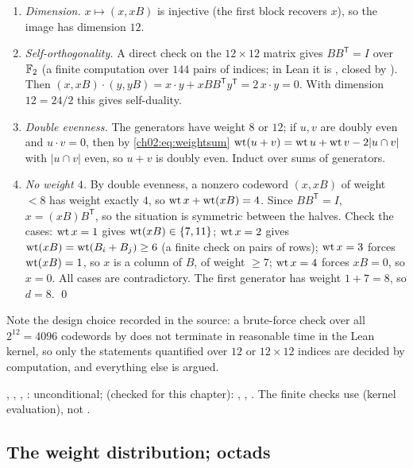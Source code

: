 \begin{enumerate}
\item \emph{Dimension.}  $x\mapsto(x,xB)$ is injective (the first block recovers $x$), so the image
has dimension $12$.
\item \emph{Self-orthogonality.}  A direct check on the $12\times12$ matrix gives $BB^{\mathsf
T}=I$ over $\mathbb{F}_2$ (a finite computation over $144$ pairs of indices; in Lean it is
, closed by ).  Then $(x,xB)\cdot(y,yB)=x\cdot
y+xBB^{\mathsf T}y^{\mathsf T}=2\,x\cdot y=0$.  With dimension $12=24/2$ this gives
self-duality.
\item \emph{Double evenness.}  The generators have weight $8$ or $12$; if $u,v$ are doubly even
and $u\cdot v=0$, then by \eqref{ch02:eq:weightsum} $\operatorname{wt}(u+v)=\operatorname{wt} u+\operatorname{wt} v-2|u\cap
v|$ with $|u\cap v|$ even, so $u+v$ is doubly even.  Induct over sums of generators.
\item \emph{No weight $4$.}  By double evenness, a nonzero codeword $(x,xB)$ of weight $<8$ has
weight exactly $4$, so $\operatorname{wt} x+\operatorname{wt}(xB)=4$.  Since $BB^{\mathsf T}=I$, $x=(xB)B^{\mathsf
T}$, so the situation is symmetric between the halves.  Check the cases: $\operatorname{wt} x=1$ gives
$\operatorname{wt}(xB)\in\{7,11\}$; $\operatorname{wt} x=2$ gives $\operatorname{wt}(xB)=\operatorname{wt}(B_i+B_j)\ge6$ (a finite
check on pairs of rows); $\operatorname{wt} x=3$ forces $\operatorname{wt}(xB)=1$, so $x$ is a column of $B$, of
weight $\ge7$; $\operatorname{wt} x=4$ forces $xB=0$, so $x=0$.  All cases are contradictory.  The first
generator has weight $1+7=8$, so $d=8$.  \qed
\end{enumerate}
Note the design choice recorded in the source: a brute-force check over all $2^{12}=4096$
codewords by  does not terminate in reasonable time in the Lean kernel, so only the
statements quantified over $12$ or $12\times12$ indices are decided by computation, and everything
else is argued.

\begin{status}
, , ,
: unconditional;  (checked for this chapter):
, , .  The finite checks use
 (kernel evaluation), not .
\end{status}

\subsection{The weight distribution; octads}\label{ch02:sec:octads}

